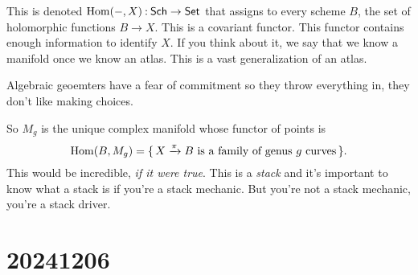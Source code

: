\documentclass[12pt]{memoir}
\begin{document}
This is denoted $\operatorname{Hom}(-,X)\mathbin{:}\mathsf{Sch}\to\mathsf{Set}$ that assigns to every scheme $B$, the set of holomorphic functions $B\to X$. This is a covariant functor. This functor contains enough information to identify $X$. If you think about it, we say that we know a manifold once we know an atlas. This is a vast generalization of an atlas.

\begin{significant}
    Algebraic geoemters have a fear of commitment so they throw everything in, they don't like making choices.
\end{significant}

So $M_g$ is the unique complex manifold whose functor of points is 
$$\operatorname{Hom}(B,M_g)=\{\,X\xrightarrow{\pi}B\text{ is a family of genus }g\text{ curves}\,\}.$$
This would be incredible, \emph{if it were true}. This is a \emph{stack} and it's important to know what a stack is if you're a stack mechanic. But you're not a stack mechanic, you're a stack driver.

\section{20241206}
\end{document}
